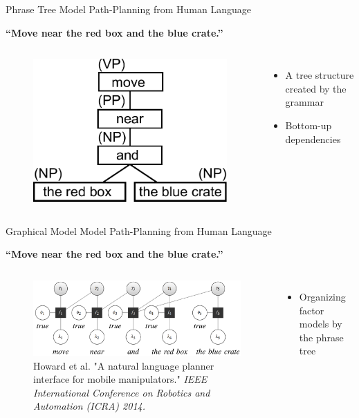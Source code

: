 \begin{frame}{Phrase Tree}{ Model Path-Planning from Human Language }

{\bf ``Move near the red box and the blue crate.''}

\begin{columns}
\begin{figure}
	\centering
	\includegraphics[width=.8\linewidth]{figure/phrase_structure2}
\end{figure}
\begin{itemize}
\item A tree structure created by the grammar
\item Bottom-up dependencies
\end{itemize}
\end{columns}

\end{frame}

\begin{frame}{Graphical Model}{ Model Path-Planning from Human Language }

{\bf ``Move near the red box and the blue crate.''}

\begin{columns}
\begin{figure}
	\centering
	\includegraphics[width=.9\linewidth]{figure/G3}
	\caption{ \tiny{ Howard et al. "A natural language planner interface for mobile manipulators." {\it IEEE International Conference on Robotics and Automation (ICRA) 2014.} } }
\end{figure}
\begin{itemize}
\item Organizing factor models by the phrase tree
\end{itemize}
\end{columns}

\end{frame}

